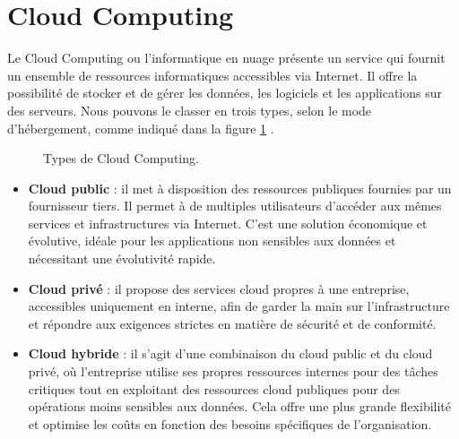 \section{Cloud Computing}
Le Cloud Computing \cite{Plu2019} ou l'informatique en nuage présente un service qui fournit un ensemble de ressources informatiques accessibles via Internet. Il offre la possibilité de stocker et de gérer les données, les logiciels et les applications sur des serveurs. Nous pouvons le classer en trois types, selon le mode d'hébergement, comme indiqué dans la figure \ref{fig:cloud} \cite{syloe2018}.
        \begin{figure}[H]
        \centering
        \caption{Types de Cloud Computing.}
        \label{fig:cloud}
        \end{figure}
\begin{itemize}
    \item \textbf{Cloud public} : il met à disposition des ressources publiques fournies par un fournisseur tiers. Il permet à de multiples utilisateurs d'accéder aux mêmes services et infrastructures via Internet. C'est une solution économique et évolutive, idéale pour les applications non sensibles aux données et nécessitant une évolutivité rapide.
    \item \textbf{Cloud privé} : il propose des services cloud propres à une entreprise, accessibles uniquement en interne, afin de garder la main sur l'infrastructure et répondre aux exigences strictes en matière de sécurité et de conformité.
    \item \textbf{Cloud hybride} : il s'agit d'une combinaison du cloud public et du cloud privé, où l'entreprise utilise ses propres ressources internes pour des tâches critiques tout en exploitant des ressources cloud publiques pour des opérations moins sensibles aux données. Cela offre une plus grande flexibilité et optimise les coûts en fonction des besoins spécifiques de l'organisation.
\end{itemize}
